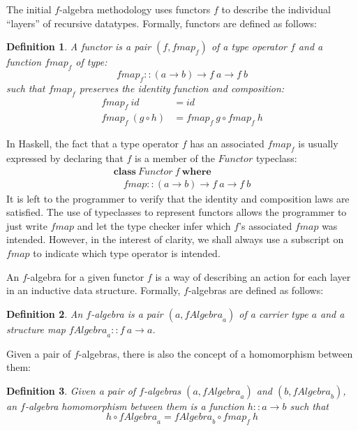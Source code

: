 \documentclass{jfp1}
\newtheorem{definition}{Definition}
\newcommand{\kw}[1]{\textbf{#1}}
\begin{document}
The initial $f$-algebra methodology uses functors $f$ to describe the
individual ``layers'' of recursive datatypes.
Formally, functors are defined as follows:
\begin{definition}\label{defn:functor}
  A \emph{functor} is a pair $(f, \mathit{fmap}_f)$ of a type operator
  $f$ and a function $\mathit{fmap}_f$ of type:
  \begin{displaymath}
    \mathit{fmap}_f :: (a \to b) \to f~a \to f~b
  \end{displaymath}
  such that $\mathit{fmap}_f$ preserves the identity function and
  composition:
  \begin{align}
    \label{eq:fmap-id}
    \mathit{fmap}_f~\mathit{id} & = \mathit{id} \\
    \label{eq:fmap-comp}
    \mathit{fmap}_f~(g \circ h) & = \mathit{fmap}_f~g \circ \mathit{fmap}_f~h
  \end{align}
\end{definition}

In Haskell, the fact that a type operator $f$ has an associated
$\mathit{fmap}_f$ is usually expressed by declaring that $f$ is a
member of the $\mathit{Functor}$ typeclass:
\begin{displaymath}
  \begin{array}{l}
    \kw{class}~\mathit{Functor}~f~\kw{where} \\
    \quad \mathit{fmap} :: (a \to b) \to f~a \to f~b
  \end{array}
\end{displaymath}
It is left to the programmer to verify that the identity and
composition laws are satisfied.
The use of typeclasses to represent functors allows
the programmer to just write $\mathit{fmap}$ and let the type checker
infer which $f$'s associated $\mathit{fmap}$ was intended. However, in
the interest of clarity, we shall always use a subscript on
$\mathit{fmap}$ to indicate which type operator is intended.

An $f$-algebra for a given functor $f$ is a way of describing an
action for each layer in an inductive data structure. Formally,
$f$-algebras are defined as follows:
\begin{definition}
  An \emph{$f$-algebra} is a pair $(a, \mathit{fAlgebra}_a)$ of a
  \emph{carrier type} $a$ and a \emph{structure map}
  $\mathit{fAlgebra}_a :: f~a \to a$.
\end{definition}
Given a pair of $f$-algebras, there is also the concept of a
homomorphism between them:
\begin{definition}
  Given a pair of $f$-algebras $(a,\mathit{fAlgebra}_a)$ and $(b,
  \mathit{fAlgebra}_b)$, an \emph{$f$-algebra homomorphism} between them is a
  function $h :: a \to b$ such that
  \begin{equation}
    \label{eq:falgebra-homomorphism}
    h \circ \mathit{fAlgebra}_a = \mathit{fAlgebra}_b \circ \mathit{fmap}_f~h
  \end{equation}
\end{definition}
\end{document}
